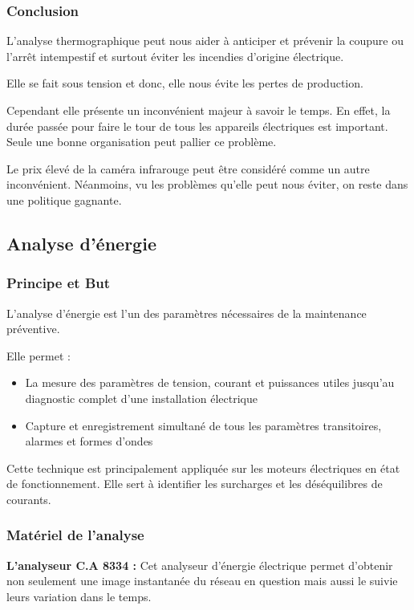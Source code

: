 \subsubsection{Conclusion}
L'analyse thermographique peut nous aider à anticiper et prévenir la coupure ou l'arrêt intempestif et surtout éviter les incendies d'origine électrique.

Elle se fait sous tension et donc, elle nous évite les pertes de production.

Cependant elle présente un inconvénient majeur à savoir le temps. En effet, la durée passée pour faire le tour de tous les appareils électriques est important. Seule une bonne organisation peut pallier ce problème.%

Le prix  élevé de la caméra infrarouge peut être considéré comme un autre inconvénient. Néanmoins, vu les problèmes qu'elle peut nous éviter, on reste dans une politique gagnante.


\subsection{Analyse d'énergie}
\subsubsection{Principe et But}
L'analyse d'énergie est l'un des paramètres nécessaires  de la maintenance  préventive. 

Elle permet :

\begin{itemize}
\item La mesure des paramètres de tension, courant et puissances utiles jusqu'au diagnostic complet d'une installation électrique

\item Capture et enregistrement simultané de tous les paramètres transitoires,  alarmes et formes d'ondes
\end{itemize}

Cette technique est principalement appliquée sur les moteurs électriques en état de fonctionnement.
Elle sert à identifier les surcharges et les déséquilibres de courants.

\subsubsection{Matériel de l'analyse}


\textbf{L'analyseur C.A 8334 : }
Cet analyseur d'énergie électrique permet d'obtenir non seulement une image instantanée du réseau en question mais aussi le suivie leurs variation dans le temps.

